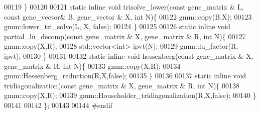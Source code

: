 \begin{DoxyCode}
00119   \}
00120 
00121   \textcolor{keyword}{static} \textcolor{keyword}{inline} \textcolor{keywordtype}{void} trisolve\_lower(\textcolor{keyword}{const} gene\_matrix & L, \textcolor{keyword}{const} gene\_vector& B, gene\_vector & X, \textcolor{keywordtype}{int} N)\{
00122     gmm::copy(B,X);
00123     gmm::lower\_tri\_solve(L, X, \textcolor{keyword}{false});
00124   \}
00125 
00126   \textcolor{keyword}{static} \textcolor{keyword}{inline} \textcolor{keywordtype}{void} partial\_lu\_decomp(\textcolor{keyword}{const} gene\_matrix & X, gene\_matrix & R, \textcolor{keywordtype}{int} N)\{
00127     gmm::copy(X,R);
00128     std::vector<int> ipvt(N);
00129     gmm::lu\_factor(R, ipvt);
00130   \}
00131 
00132   \textcolor{keyword}{static} \textcolor{keyword}{inline} \textcolor{keywordtype}{void} hessenberg(\textcolor{keyword}{const} gene\_matrix & X, gene\_matrix & R, \textcolor{keywordtype}{int} N)\{
00133     gmm::copy(X,R);
00134     gmm::Hessenberg\_reduction(R,X,\textcolor{keyword}{false});
00135   \}
00136 
00137   \textcolor{keyword}{static} \textcolor{keyword}{inline} \textcolor{keywordtype}{void} tridiagonalization(\textcolor{keyword}{const} gene\_matrix & X, gene\_matrix & R, \textcolor{keywordtype}{int} N)\{
00138     gmm::copy(X,R);
00139     gmm::Householder\_tridiagonalization(R,X,\textcolor{keyword}{false});
00140   \}
00141 
00142 \};
00143 
00144 \textcolor{preprocessor}{#endif}
\end{DoxyCode}
